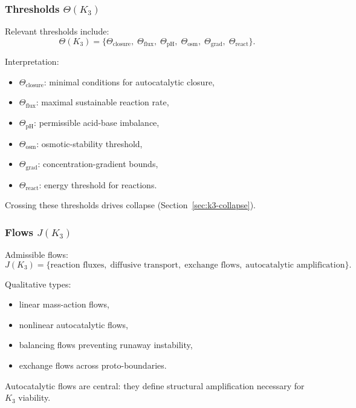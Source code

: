 \subsubsection{Thresholds \texorpdfstring{$\Theta(K_3)$}{\Theta(K_3)}}

Relevant thresholds include:
\[
\Theta(K_3) =
\{\Theta_{\mathrm{closure}},\;
  \Theta_{\mathrm{flux}},\;
  \Theta_{\mathrm{pH}},\;
  \Theta_{\mathrm{osm}},\;
  \Theta_{\mathrm{grad}},\;
  \Theta_{\mathrm{react}}\}.
\]

Interpretation:
\begin{itemize}
    \item $\Theta_{\mathrm{closure}}$: minimal conditions for
          autocatalytic closure,
    \item $\Theta_{\mathrm{flux}}$: maximal sustainable reaction rate,
    \item $\Theta_{\mathrm{pH}}$: permissible acid-base imbalance,
    \item $\Theta_{\mathrm{osm}}$: osmotic-stability threshold,
    \item $\Theta_{\mathrm{grad}}$: concentration-gradient bounds,
    \item $\Theta_{\mathrm{react}}$: energy threshold for reactions.
\end{itemize}

Crossing these thresholds drives collapse (Section~\ref{sec:k3-collapse}).

\subsubsection{Flows \texorpdfstring{$J(K_3)$}{J(K_3)}}

Admissible flows:
\[
J(K_3) = \{\text{reaction fluxes},\; \text{diffusive transport},\;
         \text{exchange flows},\; \text{autocatalytic amplification}\}.
\]

Qualitative types:
\begin{itemize}
    \item linear mass-action flows,
    \item nonlinear autocatalytic flows,
    \item balancing flows preventing runaway instability,
    \item exchange flows across proto-boundaries.
\end{itemize}

Autocatalytic flows are central: they define structural amplification
necessary for $K_3$ viability.

